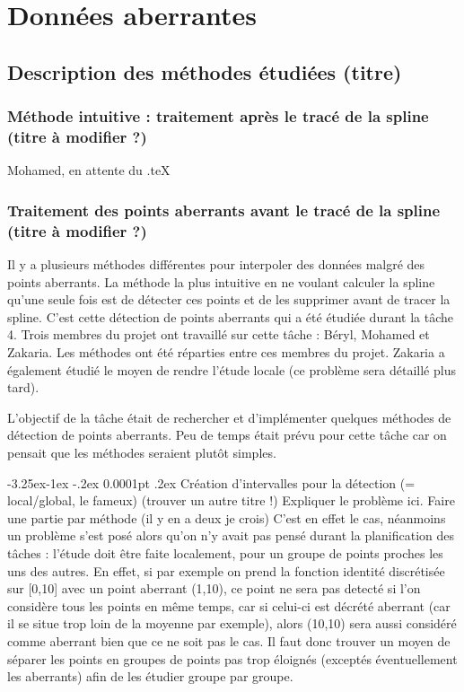 \documentclass[a4paper,12pt]{article} %
\makeatletter
\renewcommand\paragraph{\@startsection{paragraph}{4}{\z@}%
                                      {-3.25ex\@plus -1ex \@minus -.2ex}%
                                      {0.0001pt \@plus .2ex}%
                                      {\normalfont\normalsize\bfseries}}
\makeatother
\begin{document}
	\section{Données aberrantes}

		\subsection{Description des méthodes étudiées (titre)}
		
			\subsubsection{Méthode intuitive : traitement après le tracé de la spline (titre à modifier ?)}
			
			Mohamed, en attente du .teX
			
			\subsubsection{Traitement des points aberrants avant le tracé de la spline (titre à modifier ?)}
			
			Il y a plusieurs méthodes différentes pour interpoler des données malgré des points aberrants. La méthode la plus intuitive en ne voulant calculer la spline qu'une seule fois est de détecter ces points et de les supprimer avant de tracer la spline. C'est cette détection de points aberrants qui a été étudiée durant la tâche 4.
            Trois membres du projet ont travaillé sur cette tâche : Béryl, Mohamed et Zakaria. Les méthodes ont été réparties entre ces membres du projet. Zakaria a également étudié le moyen de rendre l'étude locale (ce problème sera détaillé plus tard).

            L'objectif de la tâche était de rechercher et d'implémenter quelques méthodes de détection de points aberrants. Peu de temps était prévu pour cette tâche car on pensait que les méthodes seraient plutôt simples. 

				\paragraph{Création d'intervalles pour la détection (= local/global, le fameux) (trouver un autre titre !)}
    				Expliquer le problème ici.
    				Faire une partie par méthode (il y en a deux je crois)
    				C'est en effet le cas, néanmoins un problème s'est posé alors qu'on n'y avait pas pensé durant la planification des tâches : l'étude doit être faite localement, pour un groupe de points proches les uns des autres. En effet, si par exemple on prend la fonction identité discrétisée sur [0,10] avec un point aberrant (1,10), ce point ne sera pas detecté si l'on considère tous les points en même temps, car si celui-ci est décrété aberrant (car il se situe trop loin de la moyenne par exemple), alors (10,10) sera aussi considéré comme aberrant bien que ce ne soit pas le cas. Il faut donc trouver un moyen de séparer les points en groupes de points pas trop éloignés (exceptés éventuellement les aberrants) afin de les étudier groupe par groupe.
\end{document}
